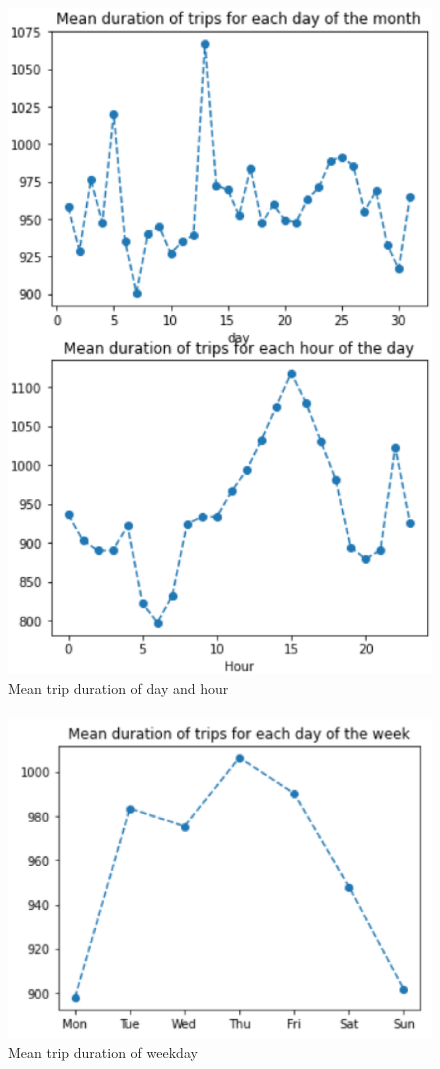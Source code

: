 \begin{figure}[htbp]
	\centering
	\includegraphics[scale=0.4]{figures/12.eps}
	\caption{Mean trip duration of day and hour } \label{12}
\end{figure}

\begin{figure}[htbp]
	\centering
	\includegraphics[scale=0.4]{figures/13.eps}
	\caption{Mean trip duration of weekday } \label{13}
\end{figure}


